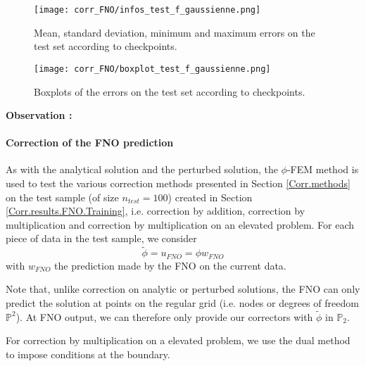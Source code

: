 \begin{minipage}{0.48\linewidth}
	\begin{figure}[H]
		\centering
		\texttt{[image: corr\_FNO/infos\_test\_f\_gaussienne.png]}
		\caption{Mean, standard deviation, minimum and maximum errors on the test set according to checkpoints.}
		\label{infos_test_f_gaussienne}
	\end{figure} 
\end{minipage}
\begin{minipage}{0.48\linewidth}
	\begin{figure}[H]
		\centering
		\texttt{[image: corr\_FNO/boxplot\_test\_f\_gaussienne.png]}
		\caption{Boxplots of the errors on the test set according to checkpoints.}
		\label{boxplot_test_f_gaussienne}
	\end{figure} 
\end{minipage}

\textbf{Observation :} 

\paragraph{Correction of the FNO prediction} \label{Corr.results.FNO.Corr}

As with the analytical solution and the perturbed solution, the $\phi$-FEM method is used to test the various correction methods presented in Section \ref{Corr.methods} on the test sample (of size $n_{test}=100$) created in Section \ref{Corr.results.FNO.Training}, i.e. correction by addition, correction by multiplication and correction by multiplication on an elevated problem. For each piece of data in the test sample, we consider  
\begin{equation*}
	\tilde{\phi}=u_{FNO}=\phi w_{FNO}
\end{equation*}
with $w_{FNO}$ the prediction made by the FNO on the current data.

\begin{Rem}
	Note that, unlike correction on analytic or perturbed solutions, the FNO can only predict the solution at points on the regular grid (i.e. nodes or degrees of freedom $\mathbb{P}^2$). At FNO output, we can therefore only provide our correctors with $\tilde{\phi}$ in $\mathbb{P}_2$.
\end{Rem}

For correction by multiplication on a elevated problem, we use the dual method to impose conditions at the boundary.

